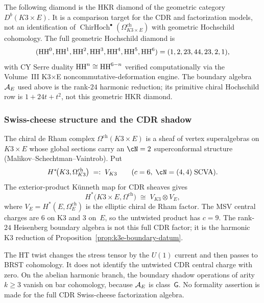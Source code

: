 \begin{remark}
\label{rem:k3e-chiral-hochschild}
The following diamond is the HKR diamond of the geometric category
$D^b(K3\times E)$. It is a comparison target for the CDR and
factorization models, not an identification of
$\operatorname{ChirHoch}^\bullet(\Omega^{\mathrm{ch}}_{K3\times E})$
with geometric Hochschild cohomology. The full geometric Hochschild
diamond is
\begin{equation}\label{eq:k3e-hh-full}
(\operatorname{HH}^0, \operatorname{HH}^1, \operatorname{HH}^2, \operatorname{HH}^3, \operatorname{HH}^4, \operatorname{HH}^5, \operatorname{HH}^6)
= (1, 2, 23, 44, 23, 2, 1),
\end{equation}
with CY Serre duality $\operatorname{HH}^n \cong \operatorname{HH}^{6-n}$ verified computationally
via the Volume~III K3$\times$E noncommutative-deformation engine.
The boundary algebra $\mathcal{A}_E$ used above is the rank-$24$ harmonic
reduction; its primitive chiral Hochschild row is
$1+24t+t^2$, not this geometric HKR diamond.
\end{remark}


\subsubsection{Swiss-cheese structure and the CDR shadow}
\label{subsubsec:k3e-swiss-cheese}

The chiral de Rham complex $\Omega^{\mathrm{ch}}(K3 \times E)$
is a sheaf of vertex superalgebras on $K3 \times E$ whose
global sections carry an $\cN = 2$ superconformal structure
(Malikov--Schechtman--Vaintrob). Put
\begin{equation}\label{eq:k3-cdr-sigma-model}
H^*\!\bigl(K3, \Omega^{\mathrm{ch}}_{K3}\bigr)
\;=:\; V_{K3}
\qquad (c = 6,\; \cN = (4,4)\;\text{SCVA}).
\end{equation}
The exterior-product K\"unneth map for CDR sheaves gives
\begin{equation}\label{eq:k3e-cdr-kunneth}
H^*\!\bigl(K3 \times E, \Omega^{\mathrm{ch}}\bigr)
\;\cong\;
V_{K3} \otimes V_E,
\end{equation}
where $V_E=H^*(E,\Omega_E^{\mathrm{ch}})$ is the elliptic chiral de
Rham factor. The MSV central charges are $6$ on K3 and $3$ on~$E$, so
the untwisted product has $c=9$. The rank-$24$ Heisenberg boundary
algebra is not this full CDR factor; it is the harmonic K3 reduction
of Proposition~\ref{prop:k3e-boundary-datum}.

The HT twist changes the stress tensor by the $U(1)$ current and then
passes to BRST cohomology. It does not identify the untwisted CDR
central charge with zero. On the abelian harmonic branch, the boundary
shadow operations of arity $k\geq 3$ vanish on bar cohomology, because
$\mathcal{A}_E$ is class~$\mathsf{G}$. No formality assertion is made for the
full CDR Swiss-cheese factorization algebra.


